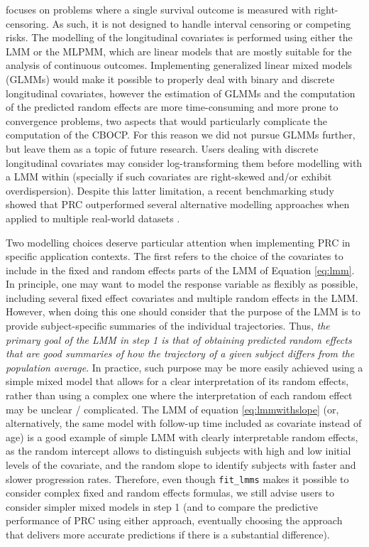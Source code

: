  focuses on problems where a single survival outcome is
measured with right-censoring. As such, it is not designed to handle
interval censoring or competing risks. The modelling of the longitudinal
covariates is performed using either the LMM or the MLPMM, which are
linear models that are mostly suitable for the analysis of continuous
outcomes. Implementing generalized linear mixed models (GLMMs) would
make it possible to properly deal with binary and discrete longitudinal
covariates, however the estimation of GLMMs and the computation of the
predicted random effects are more time-consuming and more prone to
convergence problems, two aspects that would particularly complicate the
computation of the CBOCP. For this reason we did not pursue GLMMs
further, but leave them as a topic of future research. Users dealing
with discrete longitudinal covariates may consider log-transforming them
before modelling with a LMM within  (specially if such
covariates are right-skewed and/or exhibit overdispersion). Despite this
latter limitation, a recent benchmarking study showed that PRC
outperformed several alternative modelling approaches when applied to
multiple real-world datasets \citep{signorelli2024}.

Two modelling choices deserve particular attention when implementing PRC
in specific application contexts. The first refers to the choice of the
covariates to include in the fixed and random effects parts of the LMM
of Equation \eqref{eq:lmm}. In principle, one may want to model the
response variable as flexibly as possible, including several fixed
effect covariates and multiple random effects in the LMM. However, when
doing this one should consider that the purpose of the LMM is to provide
subject-specific summaries of the individual trajectories. Thus,
\emph{the primary goal of the LMM in step 1 is that of obtaining
predicted random effects that are good summaries of how the trajectory
of a given subject differs from the population average}. In practice,
such purpose may be more easily achieved using a simple mixed model that
allows for a clear interpretation of its random effects, rather than
using a complex one where the interpretation of each random effect may
be unclear / complicated. The LMM of equation \eqref{eq:lmmwithslope}
(or, alternatively, the same model with follow-up time included as
covariate instead of age) is a good example of simple LMM with clearly
interpretable random effects, as the random intercept allows to
distinguish subjects with high and low initial levels of the covariate,
and the random slope to identify subjects with faster and slower
progression rates. Therefore, even though \texttt{fit\_lmms} makes it
possible to consider complex fixed and random effects formulas, we still
advise users to consider simpler mixed models in step 1 (and to compare
the predictive performance of PRC using either approach, eventually
choosing the approach that delivers more accurate predictions if there
is a substantial difference).

